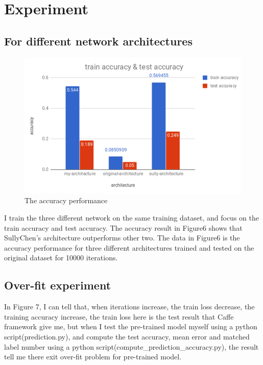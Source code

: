 \documentclass[10pt,twocolumn,letterpaper]{article}
\begin{document}
\section{Experiment}

\subsection{For different network architectures}


\begin{figure}[h]
	\begin{center}
		
		\includegraphics[width=0.8\linewidth]{accuracy.png}
	\end{center}
	\caption{The accuracy performance}
	\label{fig:long7}
	\label{fig:onecol7}
\end{figure}


I train the three different network on the same training dataset, and focus on the train accuracy and test accuracy. The accuracy result in Figure6 shows that SullyChen's architecture outperforms other two. The data in Figure6 is the accuracy performance for three different architectures trained and tested on the original dataset for 10000 iterations.








\subsection{Over-fit experiment}



In Figure 7, I can tell that, when iterations increase, the train loss decrease, the training accuracy increase, the train loss here is the test result that Caffe framework give me, but when I test the pre-trained model myself using a python script(prediction.py), and compute the test accuracy, mean error and matched label number using a python script(compute\_prediction\_accuracy.py), the result tell me there exit over-fit problem for pre-trained model.
\end{document}

